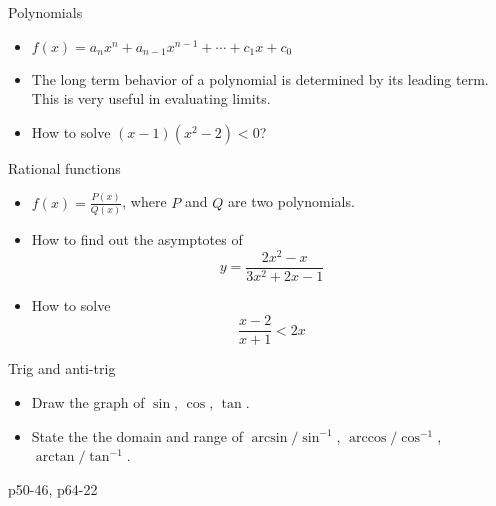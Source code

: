 \begin{frame}{Polynomials}

\begin{itemize}
\item $f\left(x\right)=a_{n}x^{n}+a_{n-1}x^{n-1}+\cdots+c_{1}x+c_{0}$
\item The long term behavior of a polynomial is determined by its \alert{leading term}.
This is very useful in evaluating \alert{limits}.
\item How to solve $\left(x-1\right)\left(x^{2}-2\right)<0$?
\end{itemize}
\end{frame}

\begin{frame}{Rational functions}

\begin{itemize}
\item $f\left(x\right)=\frac{P\left(x\right)}{Q\left(x\right)}$, where
$P$ and $Q$ are two polynomials.
\item How to find out the asymptotes of
\[
y=\frac{2x^{2}-x}{3x^{2}+2x-1}
\]

\item How to solve
\[
\frac{x-2}{x+1}<2x
\]

\end{itemize}
\end{frame}

\begin{frame}{Trig and anti-trig}

\begin{itemize}
\item Draw the graph of $\sin$, $\cos$, $\tan$.
\item State the the domain and range of $\arcsin/\sin^{-1}$, $\arccos/\cos^{-1}$,
$\arctan/\tan^{-1}$.\end{itemize}
\begin{example}
p50-46, p64-22
\end{example}

\end{frame}

